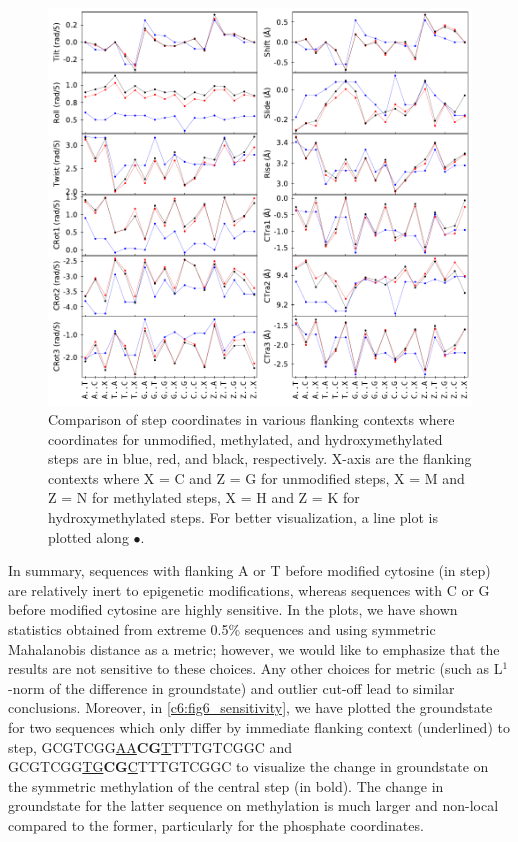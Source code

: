 \begin{figure}[H]
\begin{center}
 \includegraphics[width=15cm]{images/DNA_MDNA_HDNA_gs_MN_tet_context_gs.pdf}
\end{center}
\centering\caption{
Comparison of \cpg step coordinates in various flanking contexts where coordinates for unmodified, methylated, and hydroxymethylated \cpg steps are in blue, red, and black, respectively. X-axis are the flanking contexts where X = C and Z = G for unmodified \cpg steps, X = M and Z = N for methylated \cpg steps, X = H and Z = K for hydroxymethylated \cpg steps.
For better visualization, a line plot is plotted along $\bullet$.
}
\label{c6:fig4_tet_context}
\end{figure}
\clearpage

In summary, sequences with flanking A or T before modified cytosine (in \cpg step) are relatively inert to epigenetic modifications, whereas sequences with C or G before modified cytosine are highly sensitive. 
In the plots, we have shown statistics obtained from extreme 0.5\% sequences and using symmetric Mahalanobis distance as a metric; however, we would like to emphasize that the results are not sensitive to these choices.
Any other choices for metric (such as L$^1$-norm of the difference in groundstate) and outlier cut-off lead to similar conclusions.
Moreover, in \cref{c6:fig6_sensitivity}, we have plotted the groundstate for two sequences which only differ by immediate flanking context (underlined) to \cpg step, GCGTCGG\underline{AA}\textbf{CG}\underline{T}TTTGTCGGC and GCGTCGG\underline{TG}\textbf{CG}\underline{C}TTTGTCGGC to visualize the change in groundstate on the symmetric methylation of the central \cpg step (in bold). 
The change in groundstate for the latter sequence on  \cpg methylation is much larger and non-local compared to the former, particularly for the phosphate coordinates.

